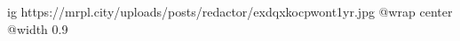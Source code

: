  
 
 
 
 

\ifcmt
  ig https://mrpl.city/uploads/posts/redactor/exdqxkocpwont1yr.jpg
  @wrap center
  @width 0.9
\fi
